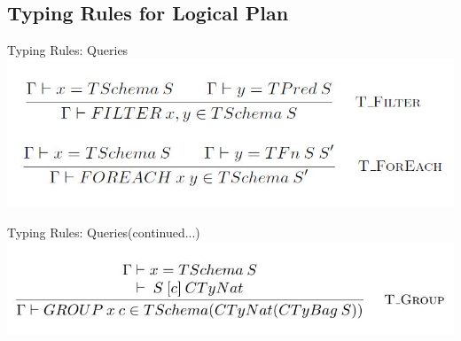 \subsection{Typing Rules for Logical Plan}
\begin{frame}{Typing Rules: Queries}
\centering
\includegraphics[scale=0.4]{Images/TypingRules/FilterForeach.JPG} 
\end{frame}

\begin{frame}{Typing Rules: Queries(continued...)}
\centering
\includegraphics[scale=0.4]{Images/TypingRules/Group.JPG} 
\end{frame}

